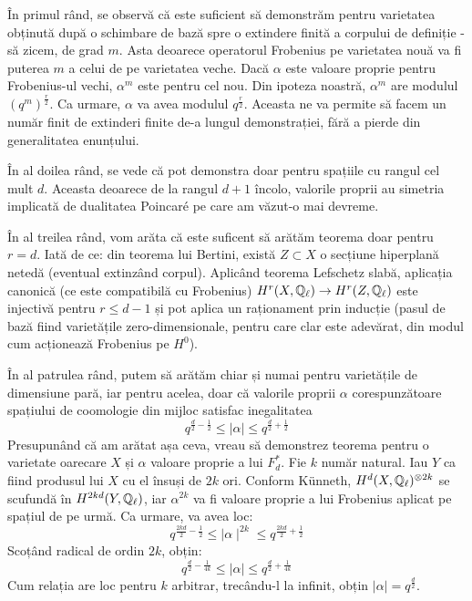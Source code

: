 \documentclass[13pt,openany,oneside]{book}
\begin{document}
În primul rând, se observă că este suficient să demonstrăm pentru varietatea obținută după o schimbare de bază spre o extindere finită a corpului de definiție - să zicem, de grad $m$. Asta deoarece operatorul Frobenius pe varietatea nouă va fi puterea $m$ a celui de pe varietatea veche. Dacă $\alpha$ este valoare proprie pentru Frobenius-ul vechi, $\alpha^m$ este pentru cel nou. Din ipoteza noastră, $\alpha^m$ are modulul $(q^{m})^{\frac{r}{2}}$. Ca urmare, $\alpha$ va avea modulul $q^{\frac{r}{2}}$. Aceasta ne va permite să facem un număr finit de extinderi finite de-a lungul demonstrației, fără a pierde din generalitatea enunțului.

În al doilea rând, se vede că pot demonstra doar pentru spațiile cu rangul cel mult $d$. Aceasta deoarece de la rangul $d+1$ încolo, valorile proprii au simetria implicată de dualitatea Poincaré pe care am văzut-o mai devreme.

În al treilea rând, vom arăta că este suficent să arătăm teorema doar pentru $r=d$. Iată de ce: din teorema lui Bertini, există $Z \subset X$ o secțiune hiperplană netedă (eventual extinzând corpul).  Aplicând teorema Lefschetz slabă, aplicația canonică (ce este compatibilă cu Frobenius) $H^r(X,\mathbb{Q}_\ell) \rightarrow H^r(Z,\mathbb{Q}_\ell)$ este injectivă pentru $r \leq d - 1$ și pot aplica un raționament prin inducție (pasul de bază fiind varietățile zero-dimensionale, pentru care clar este adevărat, din modul cum acționează Frobenius pe $H^0$).

În al patrulea rând, putem să arătăm chiar și numai pentru varietățile de dimensiune pară, iar pentru acelea, doar că valorile proprii $\alpha$ corespunzătoare spațiului de coomologie din mijloc satisfac inegalitatea
$$q^{\frac{d}{2}-\frac{1}{2}}\leq\mid \alpha\mid \leq q^{\frac{d}{2}+\frac{1}{2}}$$
Presupunând că am arătat așa ceva, vreau să demonstrez teorema pentru o varietate oarecare $X$ și $\alpha$ valoare proprie a lui $F^*_d$. Fie $k$ număr natural. Iau $Y$ ca fiind produsul lui $X$ cu el însuși de $2k$ ori. Conform Künneth, $H^d(X,\mathbb{Q}_\ell)^{\otimes 2k}$ se scufundă în $H^{2kd}(Y,\mathbb{Q}_\ell)$, iar $\alpha^{2k}$ va fi valoare proprie a lui Frobenius aplicat pe spațiul de pe urmă. Ca urmare, va avea loc:
$$q^{\frac{2kd}{2}-\frac{1}{2}}\leq\mid \alpha\mid ^{2k}\leq q^{\frac{2kd}{2}+\frac{1}{2}}$$
Scoțând radical de ordin $2k$, obțin:
$$q^{\frac{d}{2}-\frac{1}{4k}}\leq\mid \alpha\mid \leq q^{\frac{d}{2}+\frac{1}{4k}}$$
Cum relația are loc pentru $k$ arbitrar, trecându-l la infinit, obțin $\mid \alpha\mid =q^{\frac{d}{2}}$.
\end{document}
